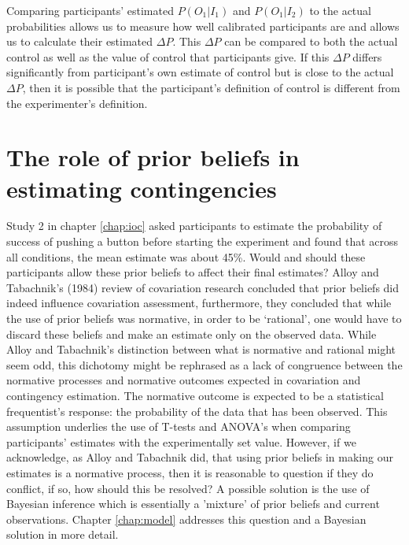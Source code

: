 \documentclass[USenglish,letterpaper,12pt,extrafontsizes,oneside,onecolumn,final]{memoir}
\begin{document}
Comparing participants' estimated $P(O_1|I_1)$ and $P(O_1|I_2)$ to the actual probabilities allows us to measure how well calibrated participants are and allows us to calculate their estimated $\Delta P$.  This $\Delta P$ can be compared to both the actual control as well as the value of control that participants give.  If this $\Delta P$ differs significantly from participant's own estimate of control but is close to the actual $\Delta P$, then it is possible that the participant's definition of control is different from the experimenter's definition.  

\section{The role of prior beliefs in estimating contingencies}

Study 2 in chapter \ref{chap:ioc} asked participants to estimate the probability of success of pushing a button before starting the experiment and found that across all conditions, the mean estimate was about 45\%.  Would and should these participants allow these prior beliefs to affect their final estimates?  Alloy and Tabachnik's (1984) review of covariation research concluded that prior beliefs did indeed influence covariation assessment, furthermore, they concluded that while the use of prior beliefs was normative, in order to be `rational', one would have to discard these beliefs and make an estimate only on the observed data.  While Alloy and Tabachnik's distinction between what is normative and rational might seem odd, this dichotomy might be rephrased as a lack of congruence between the normative processes and normative outcomes expected in covariation and contingency estimation.  The normative outcome is expected to be a statistical frequentist's response: the probability of the data that has been observed. This assumption underlies the use of T-tests and ANOVA's when comparing participants' estimates with the experimentally set value.  However, if we acknowledge, as Alloy and Tabachnik did, that using prior beliefs in making our estimates is a normative process, then it is reasonable to question if they do conflict, if so, how should this be resolved? A possible solution is the use of Bayesian inference which is essentially a 'mixture' of prior beliefs and current observations. Chapter \ref{chap:model} addresses this question and a Bayesian solution in more detail.
\end{document}
